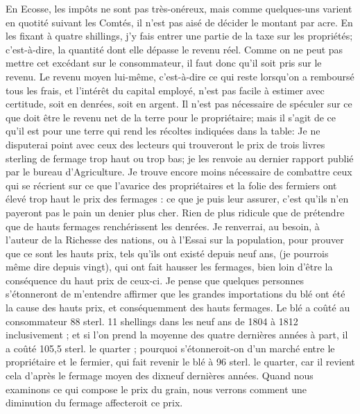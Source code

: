 En Ecosse, les impôts ne sont pas très-onéreux, mais comme quelques-uns varient en quotité suivant les Comtés, il n'est pas aisé de décider le montant par acre. En les fixant à quatre shillings, j'y fais entrer une partie de la taxe sur les propriétés; c'est-à-dire, la quantité dont elle dépasse le revenu réel. Comme on ne peut pas mettre cet excédant sur le consommateur, il faut donc qu'il soit pris sur le revenu. Le revenu moyen lui-même, c'est-à-dire ce qui reste lorsqu'on a remboursé tous les frais, et l'intérêt du capital employé, n'est pas facile à estimer avec certitude, soit en denrées, soit en argent. Il n'est pas nécessaire de spéculer sur ce que doit être le revenu net de la terre pour le propriétaire; mais il s'agit de ce qu'il est pour une terre qui rend les récoltes indiquées dans la table: Je ne disputerai point avec ceux des lecteurs qui trouveront le prix de trois livres sterling de fermage trop haut ou trop bas; je les renvoie au dernier rapport publié par le bureau d'Agriculture. Je trouve encore\setcounter{page}{324} moins nécessaire de combattre ceux qui se récrient sur ce que l'avarice des propriétaires et la folie des fermiers ont élevé trop haut le prix des fermages : ce que je puis leur assurer, c'est qu'ils n'en payeront pas le pain un denier plus cher. Rien de plus ridicule que de prétendre que de hauts fermages renchérissent les denrées. Je renverrai, au besoin, à l'auteur de la Richesse des nations, ou à l'Essai sur la population, pour prouver que ce sont les hauts prix, tels qu'ils ont existé depuis neuf ans, (je pourrois même dire depuis vingt), qui ont fait hausser les fermages, bien loin d'être la conséquence du haut prix de ceux-ci. Je pense que quelques personnes s'étonneront de m'entendre affirmer que les grandes importations du blé ont été la cause des hauts prix, et conséquemment des hauts fermages. Le blé a coûté au consommateur 88 sterl. 11 shellings dans les neuf ans de 1804 à 1812 inclusivement ; et si l'on prend la moyenne des quatre dernières années à part, il a coûté 105,5 sterl. le quarter ; pourquoi s'étonneroit-on d'un marché entre le propriétaire et le fermier, qui fait revenir le blé à 96 sterl. le quarter, car il revient cela d'après le fermage moyen des dixneuf\setcounter{page}{325} dernières années. Quand nous examinons ce qui compose le prix du grain, nous verrons comment une diminution du fermage affecteroit ce prix.
